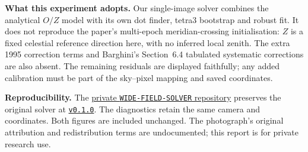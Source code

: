 \documentclass[12pt,a4paper]{article}
\begin{document}
\textbf{What this experiment adopts.}
Our single-image solver combines the analytical $O/Z$ model with its own
dot finder, tetra3 bootstrap and robust fit. It does not reproduce the paper's
multi-epoch meridian-crossing initialisation: $Z$ is a fixed celestial reference
direction here, with no inferred local zenith. The extra 1995 correction terms
and Barghini's Section~6.4 tabulated systematic corrections are also absent.
The remaining residuals are displayed faithfully; any added calibration must
be part of the sky--pixel mapping and saved coordinates.

\textbf{Reproducibility.}
The \href{https://github.com/hotblack43/WIDE-FIELD-SOLVER}{private
\texttt{WIDE-FIELD-SOLVER} repository} preserves the original solver at
\href{https://github.com/hotblack43/WIDE-FIELD-SOLVER/releases/tag/v0.1.0}{\texttt{v0.1.0}}.
The diagnostics retain the same camera and coordinates. Both figures are
included unchanged. The photograph's original attribution and redistribution
terms are undocumented; this report is for private research use.

{\small


}
\end{document}
